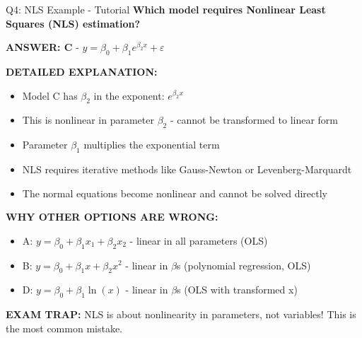 \documentclass[8pt]{beamer}
\begin{document}
	\begin{frame}{Q4: NLS Example - Tutorial}
		\fontsize{6.5}{7.5}\selectfont
		\textbf{Which model requires Nonlinear Least Squares (NLS) estimation?}
		
		\vspace{0.05cm}
		\textcolor{myblue}{\textbf{ANSWER: C}} - $y = \beta_0 + \beta_1 e^{\beta_2 x} + \varepsilon$
		
		\vspace{0.05cm}
		\textbf{DETAILED EXPLANATION:}
		\begin{itemize}
			\item Model C has $\beta_2$ in the exponent: $e^{\beta_2 x}$
			\item This is nonlinear in parameter $\beta_2$ - cannot be transformed to linear form
			\item Parameter $\beta_1$ multiplies the exponential term
			\item NLS requires iterative methods like Gauss-Newton or Levenberg-Marquardt
			\item The normal equations become nonlinear and cannot be solved directly
		\end{itemize}
		
		\vspace{0.05cm}
		\textcolor{myred}{\textbf{WHY OTHER OPTIONS ARE WRONG:}}
		\begin{itemize}
			\item \textcolor{myred}{A:} $y = \beta_0 + \beta_1 x_1 + \beta_2 x_2$ - linear in all parameters (OLS)
			\item \textcolor{myred}{B:} $y = \beta_0 + \beta_1 x + \beta_2 x^2$ - linear in $\beta$s (polynomial regression, OLS)
			\item \textcolor{myred}{D:} $y = \beta_0 + \beta_1 \ln(x)$ - linear in $\beta$s (OLS with transformed x)
		\end{itemize}
		
		\textcolor{myred}{\textbf{EXAM TRAP:}} NLS is about \textcolor{myblue}{nonlinearity in parameters}, not variables! This is the most common mistake.
	\end{frame}
	
\end{document}
